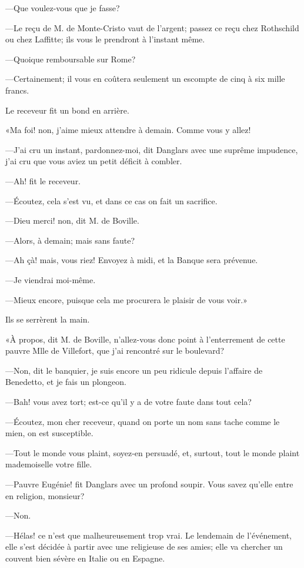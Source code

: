 —Que voulez-vous que je fasse? 

—Le reçu de M. de Monte-Cristo vaut de l'argent; passez ce reçu chez Rothschild ou chez Laffitte; ils vous le prendront à l'instant même. 

—Quoique remboursable sur Rome? 

—Certainement; il vous en coûtera seulement un escompte de cinq à six mille francs. 

Le receveur fit un bond en arrière. 

«Ma foi! non, j'aime mieux attendre à demain. Comme vous y allez! 

—J'ai cru un instant, pardonnez-moi, dit Danglars avec une suprême impudence, j'ai cru que vous aviez un petit déficit à combler. 

—Ah! fit le receveur. 

—Écoutez, cela s'est vu, et dans ce cas on fait un sacrifice. 

—Dieu merci! non, dit M. de Boville. 

—Alors, à demain; mais sans faute? 

—Ah çà! mais, vous riez! Envoyez à midi, et la Banque sera prévenue. 

—Je viendrai moi-même. 

—Mieux encore, puisque cela me procurera le plaisir de vous voir.» 

Ils se serrèrent la main. 

«À propos, dit M. de Boville, n'allez-vous donc point à l'enterrement de cette pauvre Mlle de Villefort, que j'ai rencontré sur le boulevard? 

—Non, dit le banquier, je suis encore un peu ridicule depuis l'affaire de Benedetto, et je fais un plongeon. 

—Bah! vous avez tort; est-ce qu'il y a de votre faute dans tout cela? 

—Écoutez, mon cher receveur, quand on porte un nom sans tache comme le mien, on est susceptible. 

—Tout le monde vous plaint, soyez-en persuadé, et, surtout, tout le monde plaint mademoiselle votre fille. 

—Pauvre Eugénie! fit Danglars avec un profond soupir. Vous savez qu'elle entre en religion, monsieur? 

—Non. 

—Hélas! ce n'est que malheureusement trop vrai. Le lendemain de l'événement, elle s'est décidée à partir avec une religieuse de ses amies; elle va chercher un couvent bien sévère en Italie ou en Espagne. 

